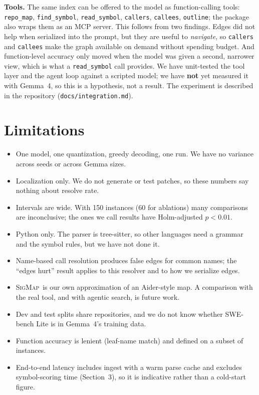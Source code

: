 \documentclass[10pt]{article}
\newcommand{\sig}{\textsc{SigMap}}
\begin{document}
\textbf{Tools.} The same index can be offered to the model as function-calling tools: \texttt{repo\_map}, \texttt{find\_symbol}, \texttt{read\_symbol}, \texttt{callers}, \texttt{callees}, \texttt{outline}; the package also wraps them as an MCP server. This follows from two findings. Edges did not help when serialized into the prompt, but they are useful to \emph{navigate}, so \texttt{callers} and \texttt{callees} make the graph available on demand without spending budget. And function-level accuracy only moved when the model was given a second, narrower view, which is what a \texttt{read\_symbol} call provides. We have unit-tested the tool layer and the agent loop against a scripted model; we have \textbf{not} yet measured it with Gemma~4, so this is a hypothesis, not a result. The experiment is described in the repository (\texttt{docs/integration.md}).

\section{Limitations}
\begin{itemize}\itemsep0pt
\item One model, one quantization, greedy decoding, one run. We have no variance across seeds or across Gemma sizes.
\item Localization only. We do not generate or test patches, so these numbers say nothing about resolve rate.
\item Intervals are wide. With 150 instances (60 for ablations) many comparisons are inconclusive; the ones we call results have Holm-adjusted $p<0.01$.
\item Python only. The parser is tree-sitter, so other languages need a grammar and the symbol rules, but we have not done it.
\item Name-based call resolution produces false edges for common names; the ``edges hurt'' result applies to this resolver and to how we serialize edges.
\item \sig\ is our own approximation of an Aider-style map. A comparison with the real tool, and with agentic search, is future work.
\item Dev and test splits share repositories, and we do not know whether SWE-bench Lite is in Gemma~4's training data.
\item Function accuracy is lenient (leaf-name match) and defined on a subset of instances.
\item End-to-end latency includes ingest with a warm parse cache and excludes symbol-scoring time (Section~3), so it is indicative rather than a cold-start figure.
\end{itemize}
\end{document}
